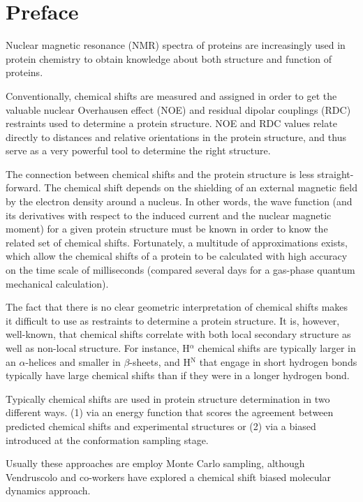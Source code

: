 \chapter*{Preface}

Nuclear magnetic resonance (NMR) spectra of proteins are increasingly used in protein chemistry to obtain knowledge about both structure and function of proteins.

Conventionally, chemical shifts are measured and assigned in order to get the valuable nuclear Overhausen effect (NOE) and residual dipolar couplings (RDC) restraints used to determine a protein structure. NOE and RDC values relate directly to distances and relative orientations in the protein structure, and thus serve as a very powerful tool to determine the right structure.

The connection between chemical shifts and the protein structure is less straight-forward.
The chemical shift depends on the shielding of an external magnetic field by the electron density around a nucleus.
In other words, the wave function (and its derivatives with respect to the induced current and the nuclear magnetic moment) for a given protein structure must be known in order to know the related set of chemical shifts.
Fortunately, a multitude of approximations exists, which allow the chemical shifts of a protein to be calculated with high accuracy on the time scale of milliseconds (compared several days for a gas-phase quantum mechanical calculation).

The fact that there is no clear geometric interpretation of chemical shifts makes it difficult to use as restraints to determine a protein structure.
It is, however, well-known, that chemical shifts correlate with both local secondary structure as well as non-local structure. For instance, H$^\alpha$ chemical shifts are typically larger in an $\alpha$-helices and smaller in $\beta$-sheets, and H$^\mathrm{N}$ that engage in short hydrogen bonds typically have large chemical shifts than if they were in a longer hydrogen bond.

Typically chemical shifts are used in protein structure determination in two different ways.
(1) via an energy function that scores the agreement between predicted chemical shifts and experimental structures or (2) via a biased introduced at the conformation sampling stage.

Usually these approaches are employ Monte Carlo sampling, although Vendruscolo and co-workers have explored a chemical shift biased molecular dynamics approach.




